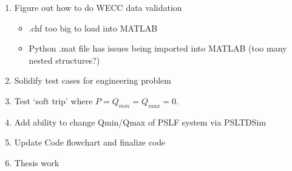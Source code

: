 \documentclass[12pt]{article}
\begin{document}
\begin{multicols}{2}
\begin{enumerate}
		\item Figure out how to do WECC data validation
\begin{itemize}
			\item .chf too big to load into MATLAB
			\item Python .mat file has issues being imported into MATLAB (too many nested structures?)
\end{itemize}

		\item Solidify test cases for engineering problem
\item Test `soft trip' where $ P = Q_{min}= Q_{max} = 0$.
\item Add ability to change Qmin/Qmax of PSLF system via PSLTDSim

		\item Update Code flowchart and finalize code%
		\item Thesis work 

\end{enumerate}

\end{multicols}
\end{document}
